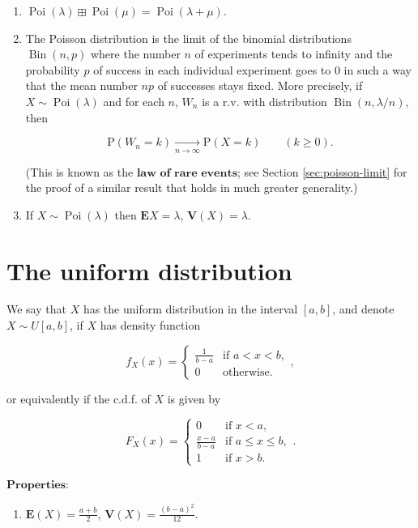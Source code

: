 \documentclass[11pt]{report}
\theoremstyle{plain}
\theoremstyle{definition}
\begin{document}
\begin{enumerate}[label=\arabic*.]
\item $\operatorname{Poi}(\lambda) \mathop{\boxplus}
\operatorname{Poi}(\mu) =
\operatorname{Poi}(\lambda+\mu)$.

\item The Poisson distribution is the limit of the binomial
distributions $\operatorname{Bin}(n,p)$ where the
number $n$ of experiments tends to infinity and the
probability $p$ of success in each individual
experiment goes to $0$ in such a way that the mean
number $np$ of successes stays fixed. More precisely,
if $X\sim \operatorname{Poi}(\lambda)$ and for each
$n$, $W_n$ is a r.v. with distribution
$\operatorname{Bin}(n,\lambda/n)$, then

\[
\mathrm{P}(W_n = k) \xrightarrow[n\to\infty]{} \mathrm{P}(X=k) \qquad (k\ge 0).
\]

(This is known as the $\textbf{law of rare events}$;
see Section \ref{sec:poisson-limit} for the proof of a
similar result that holds in much greater generality.)

\item If $X \sim \operatorname{Poi}(\lambda)$ then
$\mathbf{E} X = \lambda$, $\mathbf{V}(X)=\lambda$.
\end{enumerate}

\section{The uniform distribution}
We say that $X$ has the uniform distribution in the
interval $[a,b]$, and denote $X\sim U[a,b]$, if $X$
has density function

\[
f_X(x) = \begin{cases} \frac{1}{b-a} & \textrm{if }a<x<b, \\ 0 & \textrm{otherwise}. \end{cases},
\]

or equivalently if the c.d.f. of $X$ is given by

\[
F_X(x) = \begin{cases} 0 & \textrm{if }x<a, \\
\frac{x-a}{b-a} & \textrm{if }a\le x\le b, \\
1 & \textrm{if }x>b. \end{cases}.
\]

$\textbf{Properties:}$

\begin{enumerate}[label=\arabic*.]
\item $\mathbf{E}(X) = \frac{a+b}{2}$,
$\mathbf{V}(X) = \frac{(b-a)^2}{12}$.
\end{enumerate}
\end{document}

